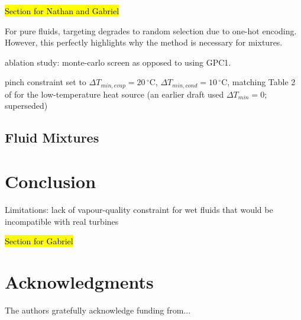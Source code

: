 \documentclass[preprint,12pt]{elsarticle}
\begin{document}
\hl{Section for Nathan and Gabriel}

For pure fluids, targeting degrades to random selection due to one-hot encoding. However, this perfectly highlights why the method is necessary for mixtures. 

ablation study: monte-carlo screen as opposed to using GPC1.

pinch constraint set to $\Delta T_{min,evap} = 20\,^{\circ}\text{C}$, $\Delta T_{min,cond} = 10\,^{\circ}\text{C}$, matching Table 2 of \citet{chys2012potential} for the low-temperature heat source (an earlier draft used $\Delta T_{min} = 0$; superseded)


\subsection{Fluid Mixtures}
\label{Mix}

\section{Conclusion}
\label{sec:conclusion}

Limitations: lack of vapour-quality constraint for wet fluids that would be incompatible with real turbines

\hl{Section for Gabriel}

\section*{Acknowledgments}
The authors gratefully acknowledge funding from...


\nocite{*}   %



\pagebreak
\makenomenclature


\renewcommand\nomgroup[1]{%
  \item[\bfseries
  \ifstrequal{#1}{A}{}{%
  \ifstrequal{#1}{B}{Abbreviations}{%
  \ifstrequal{#1}{C}{Greek variables}{%
  \ifstrequal{#1}{D}{Latin variables}{%
  \ifstrequal{#1}{E}{Script variables}{%
  \ifstrequal{#1}{F}{Subscripts}{%
  \ifstrequal{#1}{G}{Superscripts}{}}}}}}}%
]}
\end{document}
